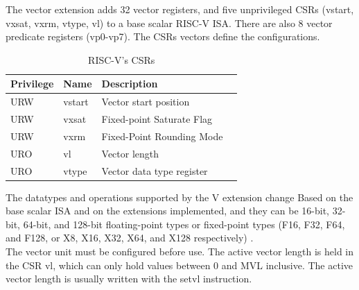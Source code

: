 The vector extension adds 32 vector registers, and five unprivileged CSRs (vstart, vxsat, vxrm, vtype, vl) to a base scalar RISC-V ISA\cite{riscv-v-specs}.
There are also 8 vector predicate registers (vp0-vp7). The CSRs vectors define the configurations.

\begin{table}[H]
    \centering
    \begin{tabular}{|l|l|l|l|}
        \hline
        Privilege & Name   & Description               \\ \hline
        URW       & vstart & Vector start position     \\ \hline
        URW       & vxsat  & Fixed-point Saturate Flag \\ \hline
        URW       & vxrm   & Fixed-Point Rounding Mode \\ \hline
        URO       & vl     & Vector length             \\ \hline
        URO       & vtype  & Vector data type register \\ \hline
    \end{tabular}
    \caption{RISC-V's CSRs}
    \label{CSRs}
\end{table}

The datatypes and operations supported by the V extension change Based on the
base scalar ISA and on the extensions implemented, and they can be 16-bit, 32-bit, 64-bit, and 128-bit ﬂoating-point types or fixed-point types (F16, F32, F64, and F128, or X8, X16, X32, X64, and X128 respectively) \cite{riscv-v-specs}.\\


The vector unit must be conﬁgured before use. 
The active vector length is held in the CSR vl, which can only hold values between 0 and MVL inclusive.
The active vector length is usually written with the setvl instruction.\\


